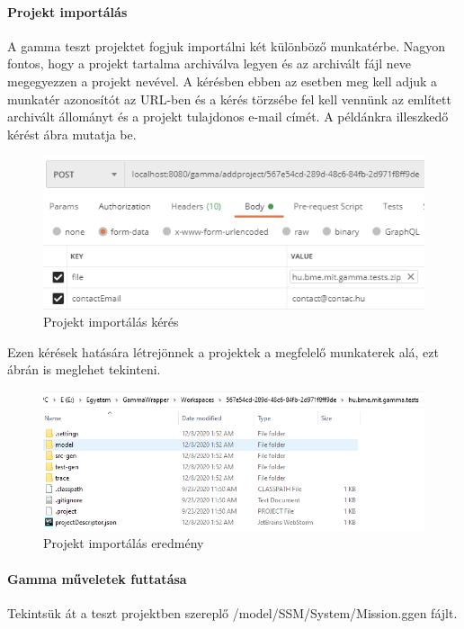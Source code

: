 \paragraph{Projekt importálás} A gamma teszt projektet fogjuk importálni két különböző munkatérbe. Nagyon fontos, hogy a projekt tartalma archiválva legyen és az archivált fájl neve megegyezzen a projekt nevével. A kérésben ebben az esetben meg kell adjuk a munkatér azonosítót az URL-ben és a kérés törzsébe fel kell vennünk az említett archivált állományt és a projekt tulajdonos e-mail címét. A példánkra illeszkedő kérést  ábra mutatja be.


\begin{figure}[!ht]
	\includegraphics[keepaspectratio]{figures/add_project_request.PNG}
	\caption{Projekt importálás kérés}
	\label{fig:add_project_request}
\end{figure}

Ezen kérések hatására létrejönnek a projektek a megfelelő munkaterek alá, ezt  ábrán is meglehet tekinteni.

\begin{figure}[!ht]
	\includegraphics[width=150mm, keepaspectratio]{figures/add_project_result.PNG}
	\caption{Projekt importálás eredmény}
	\label{fig:add_project_result}
\end{figure}

\paragraph{Gamma műveletek futtatása} Tekintsük át a teszt projektben szereplő /model/SSM/System/Mission.ggen fájlt.

